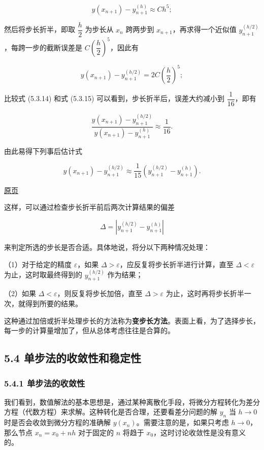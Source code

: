 \documentclass[
  10pt,
  fontset=fandol]{ctexart}
\begin{document}
\[
y(x_{n+1})-y_{n+1}^{(h)}\approx Ch^5;\tag{5.3.14}
\]

然后将步长折半，即取 \(\dfrac{h}{2}\) 为步长从 \(x_n\) 跨两步到 \(x_{n+1}\)，再求得一个近似值 \(y_{n+1}^{(h/2)}\)，每跨一步的截断误差是 \(C\left(\dfrac{h}{2}\right)^5\)，因此有

\[
y(x_{n+1})-y_{n+1}^{(h/2)}=2C\left(\frac{h}{2}\right)^5;\tag{5.3.15}
\]

比较式 (5.3.14) 和式 (5.3.15) 可以看到，步长折半后，误差大约减小到 \(\dfrac{1}{16}\)，即有

\[
\frac{y(x_{n+1})-y_{n+1}^{(h/2)}}{y(x_{n+1})-y_{n+1}^{(h)}}\approx\frac{1}{16}.
\]

由此易得下列事后估计式

\[
y(x_{n+1})-y_{n+1}^{(h/2)}\approx\frac{1}{15}(y_{n+1}^{(h/2)}-y_{n+1}^{(h)}).
\]

\href{../../source-images/pdf-133.jpeg}{原页}

这样，可以通过检查步长折半前后两次计算结果的偏差

\[
\Delta=|y_{n+1}^{(h/2)}-y_{n+1}^{(h)}|
\]

来判定所选的步长是否合适。具体地说，将分以下两种情况处理：

（1）对于给定的精度 \(\varepsilon\)，如果 \(\Delta>\varepsilon\)，应反复将步长折半进行计算，直至 \(\Delta<\varepsilon\) 为止，这时取最终得到的 \(y_{n+1}^{(h/2)}\) 作为结果；

（2）如果 \(\Delta<\varepsilon\)，则反复将步长加倍，直至 \(\Delta>\varepsilon\) 为止，这时再将步长折半一次，就得到所要的结果。

这种通过加倍或折半处理步长的方法称为\textbf{变步长方法}。表面上看，为了选择步长，每一步的计算量增加了，但从总体考虑往往是合算的。

\subsection{5.4 单步法的收敛性和稳定性}\label{ux5355ux6b65ux6cd5ux7684ux6536ux655bux6027ux548cux7a33ux5b9aux6027}

\subsubsection{5.4.1 单步法的收敛性}\label{ux5355ux6b65ux6cd5ux7684ux6536ux655bux6027}

我们看到，数值解法的基本思想是，通过某种离散化手段，将微分方程转化为差分方程（代数方程）来求解。这种转化是否合理，还要看差分问题的解 \(y_n\) 当 \(h\to0\) 时是否会收敛到微分方程的准确解 \(y(x_n)\)。需要注意的是，如果只考虑 \(h\to0\)，那么节点 \(x_n=x_0+nh\) 对于固定的 \(n\) 将趋于 \(x_0\)，这时讨论收敛性是没有意义的。
\end{document}
